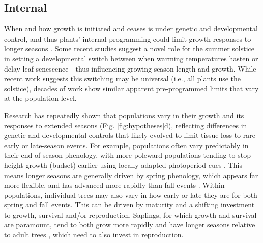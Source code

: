 \documentclass[11pt]{article}
\begin{document}
\subsection*{Internal}
When and how growth is initiated and ceases is under genetic and developmental control, and thus plants' internal programming could limit growth responses to longer seasons \citep{marchand2021timing,mckown2016impacts,soolanayakanahally2013timing}. Some recent studies suggest a novel role for the summer solstice \citep{zohner2023effect} in setting a developmental switch between when warming temperatures hasten or delay leaf senescence---thus influencing growing season length and growth. While recent work suggests this switching may be universal (i.e., all plants use the solstice), decades of work show similar apparent pre-programmed limits that vary at the population level. 

Research has repeatedly shown that populations vary in their growth and its responses to extended seasons (Fig. \ref{fig:hypotheses}d), reflecting differences in genetic and developmental controls that likely evolved to limit tissue loss to rare early or late-season events. For example, populations often vary predictably in their end-of-season phenology, with more poleward populations tending to stop height growth (budset) earlier using locally adapted photoperiod cues \citep{soolanayakanahally2013timing,aitken2016}. This means longer seasons are generally driven by spring phenology, which appears far more flexible, and has advanced more rapidly than fall events \citep{aitken2016}. Within populations, individual trees may also vary in how early or late they are for both spring and fall events. This can be driven by maturity and a shifting investment to growth, survival and/or reproduction. Saplings, for which growth and survival are paramount, tend to both grow more rapidly \citep{hilty2021plant} and have longer seasons relative to adult trees \citep{augspurger2003differences,rozendaal2010tropical,vitasse2014earlier}, which need to also invest in reproduction. %
\end{document}
